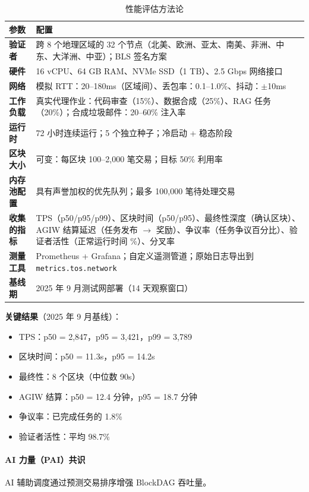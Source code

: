 \documentclass[11pt]{article}
\begin{document}
\begin{table}[H]
\centering
\caption{性能评估方法论}
\label{tab:evaluation-methodology}
\begin{tabular}{@{}p{}p{}@{}}
\toprule
\textbf{参数} & \textbf{配置} \\ \midrule
\textbf{验证者} & 跨 8 个地理区域的 32 个节点（北美、欧洲、亚太、南美、非洲、中东、大洋洲、中亚）；BLS 签名方案 \\
\textbf{硬件} & 16 vCPU、64 GB RAM、NVMe SSD（1 TB）、2.5 Gbps 网络接口 \\
\textbf{网络} & 模拟 RTT：20--180ms（区域间）、丢包率：0.1--1.0\%、抖动：$\pm$10ms \\
\textbf{工作负载} & 真实代理作业：代码审查（15\%）、数据合成（25\%）、RAG 任务（20\%）；合成垃圾邮件：20--60\% 注入率 \\
\textbf{运行时} & 72 小时连续运行；5 个独立种子；冷启动 + 稳态阶段 \\
\textbf{区块大小} & 可变：每区块 100--2,000 笔交易；目标 50\% 利用率 \\
\textbf{内存池配置} & 具有声誉加权的优先队列；最多 100,000 笔待处理交易 \\
\textbf{收集的指标} & TPS（p50/p95/p99）、区块时间（p50/p95）、最终性深度（确认区块）、AGIW 结算延迟（任务发布 $\rightarrow$ 奖励）、争议率（任务争议百分比）、验证者活性（正常运行时间 \%）、分叉率 \\
\textbf{测量工具} & Prometheus + Grafana；自定义遥测管道；原始日志导出到 \texttt{metrics.tos.network} \\
\textbf{基线期} & 2025 年 9 月测试网部署（14 天观察窗口） \\
\bottomrule
\end{tabular}
\end{table}

\textbf{关键结果}（2025 年 9 月基线）：
\begin{itemize}[noitemsep]
  \item TPS：p50 = 2,847，p95 = 3,421，p99 = 3,789
  \item 区块时间：p50 = 11.3s，p95 = 14.2s
  \item 最终性：8 个区块（中位数 90s）
  \item AGIW 结算：p50 = 12.4 分钟，p95 = 18.7 分钟
  \item 争议率：已完成任务的 1.8\%
  \item 验证者活性：平均 98.7\%
\end{itemize}

\paragraph{AI 力量（PAI）共识}
AI 辅助调度通过预测交易排序增强 BlockDAG 吞吐量。
\end{document}
